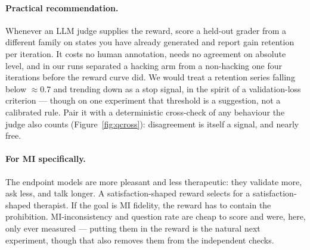 \paragraph{Practical recommendation.} Whenever an LLM judge supplies the reward, score a
held-out grader from a different family on states you have already generated and report gain
retention per iteration. It costs no human annotation, needs no agreement on absolute level, and
in our runs separated a hacking arm from a non-hacking one four iterations before the reward
curve did. We would treat a retention series falling below ${\approx}0.7$ and trending down as a
stop signal, in the spirit of a validation-loss criterion --- though on one experiment that
threshold is a suggestion, not a calibrated rule. Pair it with a deterministic cross-check of
any behaviour the judge also counts (Figure~\ref{fig:qcross}): disagreement is itself a signal,
and nearly free.

\paragraph{For MI specifically.} The endpoint models are more pleasant and less therapeutic:
they validate more, ask less, and talk longer. A satisfaction-shaped reward selects for a
satisfaction-shaped therapist. If the goal is MI fidelity, the reward has to contain the
prohibition. MI-inconsistency and question rate are cheap to score and were, here, only ever
measured --- putting them in the reward is the natural next experiment, though that also
removes them from the independent checks.
